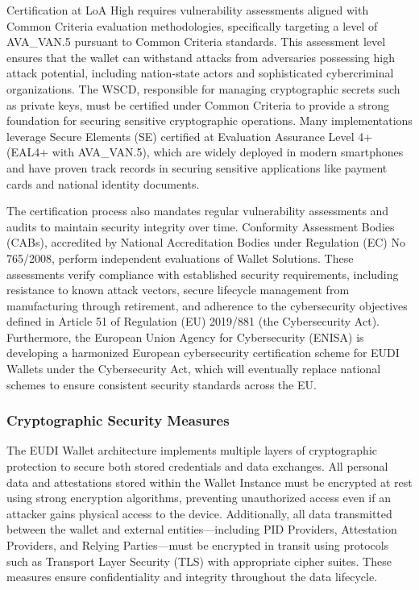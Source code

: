 \documentclass[sigconf,balance,nonacm,authordraft]{acmart}
\begin{document}
Certification at LoA High requires vulnerability assessments aligned with Common Criteria evaluation methodologies, specifically targeting a level of AVA\_VAN.5 pursuant to Common Criteria standards. This assessment level ensures that the wallet can withstand attacks from adversaries possessing high attack potential, including nation-state actors and sophisticated cybercriminal organizations. The WSCD, responsible for managing cryptographic secrets such as private keys, must be certified under Common Criteria to provide a strong foundation for securing sensitive cryptographic operations. Many implementations leverage Secure Elements (SE) certified at Evaluation Assurance Level 4+ (EAL4+ with AVA\_VAN.5), which are widely deployed in modern smartphones and have proven track records in securing sensitive applications like payment cards and national identity documents.

The certification process also mandates regular vulnerability assessments and audits to maintain security integrity over time. Conformity Assessment Bodies (CABs), accredited by National Accreditation Bodies under Regulation (EC) No 765/2008, perform independent evaluations of Wallet Solutions. These assessments verify compliance with established security requirements, including resistance to known attack vectors, secure lifecycle management from manufacturing through retirement, and adherence to the cybersecurity objectives defined in Article 51 of Regulation (EU) 2019/881 (the Cybersecurity Act). Furthermore, the European Union Agency for Cybersecurity (ENISA) is developing a harmonized European cybersecurity certification scheme for EUDI Wallets under the Cybersecurity Act, which will eventually replace national schemes to ensure consistent security standards across the EU.

\subsubsection{Cryptographic Security Measures}

The EUDI Wallet architecture implements multiple layers of cryptographic protection to secure both stored credentials and data exchanges. All personal data and attestations stored within the Wallet Instance must be encrypted at rest using strong encryption algorithms, preventing unauthorized access even if an attacker gains physical access to the device. Additionally, all data transmitted between the wallet and external entities—including PID Providers, Attestation Providers, and Relying Parties—must be encrypted in transit using protocols such as Transport Layer Security (TLS) with appropriate cipher suites. These measures ensure confidentiality and integrity throughout the data lifecycle.
\end{document}
